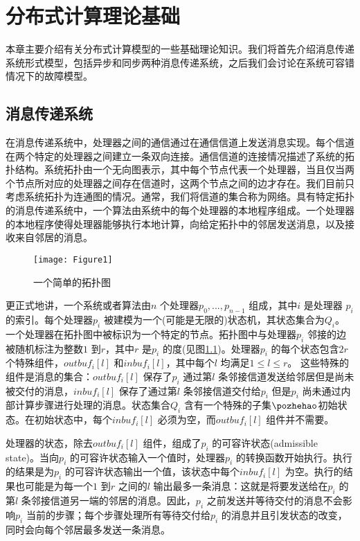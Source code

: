 \chapter{分布式计算理论基础}
    本章主要介绍有关分布式计算模型的一些基础理论知识。我们将首先介绍消息传递系统形式模型，包括异步和同步两种消息传递系统，之后我们会讨论在系统可容错情况下的故障模型。

    \section{消息传递系统}
    在消息传递系统中，处理器之间的通信通过在通信信道上发送消息实现。每个信道在两个特定的处理器之间建立一条双向连接。通信信道的连接情况描述了系统的拓扑结构。系统拓扑由一个无向图表示，其中每个节点代表一个处理器，当且仅当两个节点所对应的处理器之间存在信道时，这两个节点之间的边才存在。我们目前只考虑系统拓扑为连通图的情况。通常，我们将信道的集合称为网络。具有特定拓扑的消息传递系统中，一个算法由系统中的每个处理器的本地程序组成。一个处理器的本地程序使得处理器能够执行本地计算，向给定拓扑中的邻居发送消息，以及接收来自邻居的消息。
    \begin{figure}[ht]
        \centering
        \texttt{[image: Figure1]}\\
        \caption{一个简单的拓扑图}\label{Figure1}
    \end{figure}

    更正式地讲，一个系统或者算法由$n$ 个处理器$p_0,...,p_{n-1}$ 组成，其中$i$ 是处理器 $p_i$ 的索引。每个处理器$p_i$ 被建模为一个(可能是无限的)状态机，其状态集合为$Q_i$\cite{lynch1981describing}。一个处理器在拓扑图中被标识为一个特定的节点。拓扑图中与处理器$p_i$ 邻接的边被随机标注为整数$1$ 到$r$，其中$r$ 是$p_i$ 的度(见图\ref{Figure1})。处理器$p_i$ 的每个状态包含$2r$ 个特殊组件，$outbuf_i[l]$ 和$inbuf_i[l]$，其中每个$l$ 均满足$1 \leq l \leq r$。 这些特殊的组件是消息的集合：$outbuf_i[l]$ 保存了$p_i$ 通过第$l$ 条邻接信道发送给邻居但是尚未被交付的消息，$inbuf_i[l]$ 保存了通过第$l$ 条邻接信道交付给$p_i$ 但是$p_i$ 尚未通过内部计算步骤进行处理的消息。状态集合$Q_i$ 含有一个特殊的子集$\pozhehao$初始状态。在初始状态中，每个$inbuf_i[l]$ 必须为空，而$outbuf_i[l]$ 组件并不需要。

    处理器的状态，除去$outbuf_i[l]$ 组件，组成了$p_i$ 的可容许状态(admissible state)。当向$p_i$ 的可容许状态输入一个值时，处理器$p_i$ 的转换函数开始执行。执行的结果是为$p_i$ 的可容许状态输出一个值，该状态中每个$inbuf_i[l]$ 为空。执行的结果也可能是为每一个$1$ 到$r$ 之间的$l$ 输出最多一条消息：这就是将要发送给在$p_i$ 的第$l$ 条邻接信道另一端的邻居的消息。因此，$p_i$ 之前发送并等待交付的消息不会影响$p_i$ 当前的步骤；每个步骤处理所有等待交付给$p_i$ 的消息并且引发状态的改变，同时会向每个邻居最多发送一条消息。

